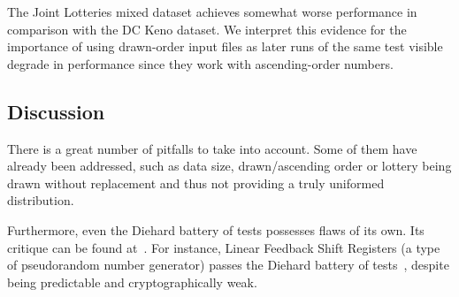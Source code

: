 The Joint Lotteries mixed dataset achieves somewhat worse performance in comparison with the DC Keno dataset. We interpret this
evidence for the importance of using drawn-order input files as later runs of the same test visible degrade in performance
since they work with ascending-order numbers.

\subsection{Discussion}

There is a great number of pitfalls to take into account. Some of them have already been addressed, such as data size,
drawn/ascending order or lottery being drawn without replacement and thus not providing a truly uniformed distribution.

Furthermore, even the Diehard battery of tests possesses flaws of its own. Its critique can be found
at~\cite{dieharder, critique}. For instance, Linear Feedback Shift Registers (a type of pseudorandom number
generator) passes the Diehard battery of tests~\cite{LFSR}, despite being predictable and cryptographically weak.
